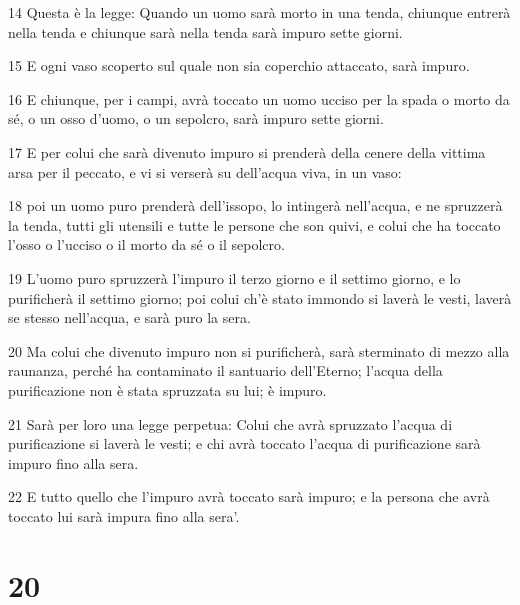 \par 14 Questa è la legge: Quando un uomo sarà morto in una tenda, chiunque entrerà nella tenda e chiunque sarà nella tenda sarà impuro sette giorni.
\par 15 E ogni vaso scoperto sul quale non sia coperchio attaccato, sarà impuro.
\par 16 E chiunque, per i campi, avrà toccato un uomo ucciso per la spada o morto da sé, o un osso d'uomo, o un sepolcro, sarà impuro sette giorni.
\par 17 E per colui che sarà divenuto impuro si prenderà della cenere della vittima arsa per il peccato, e vi si verserà su dell'acqua viva, in un vaso:
\par 18 poi un uomo puro prenderà dell'issopo, lo intingerà nell'acqua, e ne spruzzerà la tenda, tutti gli utensili e tutte le persone che son quivi, e colui che ha toccato l'osso o l'ucciso o il morto da sé o il sepolcro.
\par 19 L'uomo puro spruzzerà l'impuro il terzo giorno e il settimo giorno, e lo purificherà il settimo giorno; poi colui ch'è stato immondo si laverà le vesti, laverà se stesso nell'acqua, e sarà puro la sera.
\par 20 Ma colui che divenuto impuro non si purificherà, sarà sterminato di mezzo alla raunanza, perché ha contaminato il santuario dell'Eterno; l'acqua della purificazione non è stata spruzzata su lui; è impuro.
\par 21 Sarà per loro una legge perpetua: Colui che avrà spruzzato l'acqua di purificazione si laverà le vesti; e chi avrà toccato l'acqua di purificazione sarà impuro fino alla sera.
\par 22 E tutto quello che l'impuro avrà toccato sarà impuro; e la persona che avrà toccato lui sarà impura fino alla sera'.

\chapter{20}

